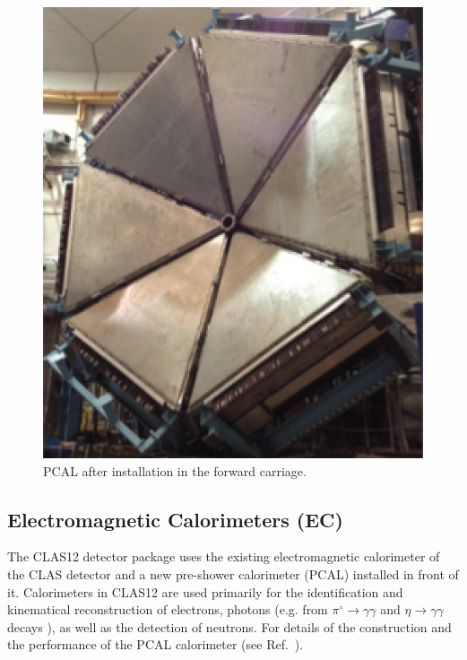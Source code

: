 \documentclass[final,3p,twocolumn]{elsarticle}
\begin{document}
\begin{figure}[htbp!]
\centerline{\includegraphics[width=0.95\columnwidth]{PCAL.png}}
\caption{PCAL after installation in the forward carriage. }
\label{ec-pcal}
\end{figure}

\subsection{Electromagnetic Calorimeters (EC)}

The CLAS12 detector package uses the existing electromagnetic calorimeter of the CLAS detector
\cite{Amarian:2001zs} and a new pre-shower calorimeter (PCAL) installed in front of it. Calorimeters in CLAS12 are
used primarily for the identification and kinematical reconstruction of electrons, photons (e.g. from
$\pi^\circ \to \gamma \gamma$ and $\eta \to \gamma  \gamma$ decays ), as well as the detection of neutrons. For
details of the construction and the performance of the PCAL calorimeter (see Ref.~\cite{PCAL}). 
\end{document}
